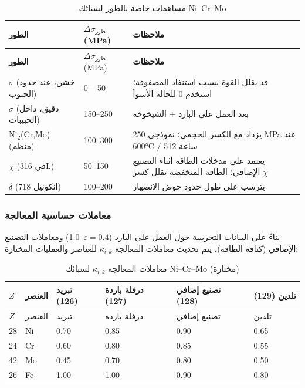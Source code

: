 \documentclass[12pt,a4paper]{article}
\begin{document}
	\begin{longtable}{p{3.5cm} p{3.0cm} p{4.0cm}}
		\caption{مساهمات خاصة بالطور لسبائك Ni–Cr–Mo}\label{tab:nicrmo_phase_contrib}\\
		\toprule
		\textbf{الطور} & \(\Delta\sigma_{\text{طور}}\) (MPa) & \textbf{ملاحظات} \\
		\midrule
		\endfirsthead
		\toprule
		\textbf{الطور} & \(\Delta\sigma_{\text{طور}}\) (MPa) & \textbf{ملاحظات} \\
		\midrule
		\endhead
		\(\sigma\) (خشن، عند حدود الحبوب) & 0 – 50 & قد يقلل القوة بسبب استنفاد المصفوفة؛ استخدم 0 للحالة الأسوأ \\
		\(\sigma\) (دقيق، داخل الحبيبات) & 150–250 & بعد العمل على البارد + الشيخوخة \\
		Ni\(_2\)(Cr,Mo) (منظم) & 100–300 & يزداد مع الكسر الحجمي؛ نموذجي 250 MPa عند 600°C / 512 ساعة \\
		\(\chi\) (في 316L) & 50–150 & يعتمد على مدخلات الطاقة أثناء التصنيع الإضافي؛ الطاقة المنخفضة تقلل كسر \(\chi\) \\
		\(\delta\) (إنكونيل 718) & 100–200 & يترسب على طول حدود حوض الانصهار \\
		\bottomrule
	\end{longtable}
	
	\subsubsection{معاملات حساسية المعالجة}
	بناءً على البيانات التجريبية حول العمل على البارد (\(\varepsilon=0.4\)–1.0) ومعاملات التصنيع الإضافي (كثافة الطاقة)، يتم تحديث معاملات المعالجة \(\kappa_{i,k}\) للعناصر والعمليات المختارة:
	
	\begin{longtable}{p{1.5cm} p{1.2cm} p{1.8cm} p{1.8cm} p{1.8cm} p{1.8cm}}
		\caption{معاملات المعالجة \(\kappa_{i,k}\) لسبائك Ni–Cr–Mo (مختارة)}\label{tab:nicrmo_kappa_ik}\\
		\toprule
		\(Z\) & العنصر & تبريد (126) & درفلة باردة (127) & تصنيع إضافي (128) & تلدين (129) \\
		\midrule
		\endfirsthead
		\toprule
		\(Z\) & العنصر & تبريد & درفلة باردة & تصنيع إضافي & تلدين \\
		\midrule
		\endhead
		28 & Ni & 0.70 & 0.85 & 0.90 & 0.65 \\
		24 & Cr & 0.60 & 0.80 & 0.85 & 0.55 \\
		42 & Mo & 0.45 & 0.70 & 0.80 & 0.50 \\
		26 & Fe & 1.00 & 1.00 & 0.90 & 0.80 \\
		\bottomrule
	\end{longtable}
	
\end{document}
